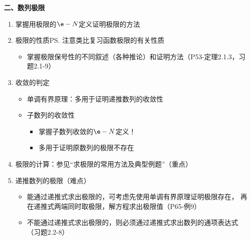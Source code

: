 \bigskip

{\bf 二、数列极限}
\begin{enumerate}
  \item 掌握用极限的$\e-N$定义证明极限的方法
  \item 极限的性质\ps{注意类比复习函数极限的有关性质}
  \begin{itemize}
    \item 掌握极限保号性的不同叙述（各种推论）和证明方法（P53-定理2.1.3，习题2.1-9）
  \end{itemize}
  \item 收敛的判定
  \begin{itemize}
    \item 单调有界原理：多用于证明递推数列的收敛性
    \item 子数列的收敛性
    \begin{itemize}
      \item 掌握子数列收敛的$\e-N$定义！
      \item 多用于证明原数列的极限不存在
    \end{itemize}
  \end{itemize}
  \item 极限的计算：参见“求极限的常用方法及典型例题”（重点）
  \item 递推数列的极限（难点）
  \begin{itemize}
    \item 能通过递推式求出极限的，可考虑先使用单调有界原理证明极限存在，
    再在递推式两端同时取极限，解方程求出极限值（P65-例9）
    \item 不能通过递推式求出极限的，则必须通过递推式求出数列的通项表达式（习题2.2-8）
  \end{itemize}
\end{enumerate}

\bigskip

